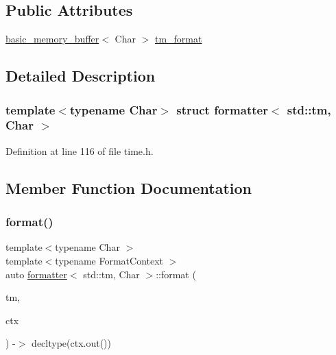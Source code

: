 \subsection*{Public Attributes}
\begin{DoxyCompactItemize}
\item 
\hyperlink{classbasic__memory__buffer}{basic\+\_\+memory\+\_\+buffer}$<$ Char $>$ \hyperlink{structformatter_3_01std_1_1tm_00_01_char_01_4_a2a9d9612580cc86f7670f68eb150ca95}{tm\+\_\+format}
\end{DoxyCompactItemize}


\subsection{Detailed Description}
\subsubsection*{template$<$typename Char$>$\newline
struct formatter$<$ std\+::tm, Char $>$}



Definition at line 116 of file time.\+h.



\subsection{Member Function Documentation}
\mbox{\label{structformatter_3_01std_1_1tm_00_01_char_01_4_ab9ede05d9788f38bfc435af29d7fefe0}} 
\subsubsection{\texorpdfstring{format()}{format()}}
{\footnotesize\ttfamily template$<$typename Char $>$ \\
template$<$typename Format\+Context $>$ \\
auto \hyperlink{structformatter}{formatter}$<$ std\+::tm, Char $>$\+::format (\begin{DoxyParamCaption}\item[{const std\+::tm \&}]{tm,  }\item[{Format\+Context \&}]{ctx }\end{DoxyParamCaption}) -\/$>$ decltype(ctx.\+out()) \hspace{0.3cm}{\ttfamily [inline]}}




